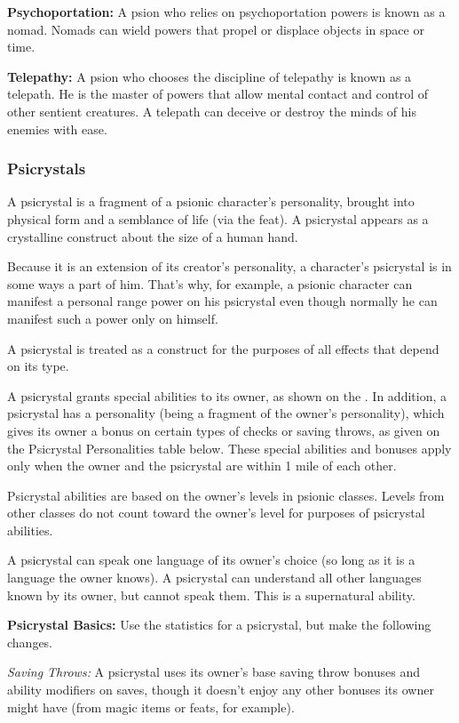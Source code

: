 \textbf{Psychoportation:} A psion who relies on psychoportation powers is known as a nomad. Nomads can wield powers that propel or displace objects in space or time.

\textbf{Telepathy:} A psion who chooses the discipline of telepathy is known as a telepath. He is the master of powers that allow mental contact and control of other sentient creatures. A telepath can deceive or destroy the minds of his enemies with ease.

\subsubsection{Psicrystals}
A psicrystal is a fragment of a psionic character's personality, brought into physical form and a semblance of life (via the  feat). A psicrystal appears as a crystalline construct about the size of a human hand.

Because it is an extension of its creator's personality, a character's psicrystal is in some ways a part of him. That's why, for example, a psionic character can manifest a personal range power on his psicrystal even though normally he can manifest such a power only on himself.

A psicrystal is treated as a construct for the purposes of all effects that depend on its type.

A psicrystal grants special abilities to its owner, as shown on the . In addition, a psicrystal has a personality (being a fragment of the owner's personality), which gives its owner a bonus on certain types of checks or saving throws, as given on the Psicrystal Personalities table below. These special abilities and bonuses apply only when the owner and the psicrystal are within 1 mile of each other.

Psicrystal abilities are based on the owner's levels in psionic classes. Levels from other classes do not count toward the owner's level for purposes of psicrystal abilities.

A psicrystal can speak one language of its owner's choice (so long as it is a language the owner knows). A psicrystal can understand all other languages known by its owner, but cannot speak them. This is a supernatural ability.

\textbf{Psicrystal Basics:} Use the statistics for a psicrystal, but make the following changes.

\textit{Saving Throws:} A psicrystal uses its owner's base saving throw bonuses and ability modifiers on saves, though it doesn't enjoy any other bonuses its owner might have (from magic items or feats, for example).

